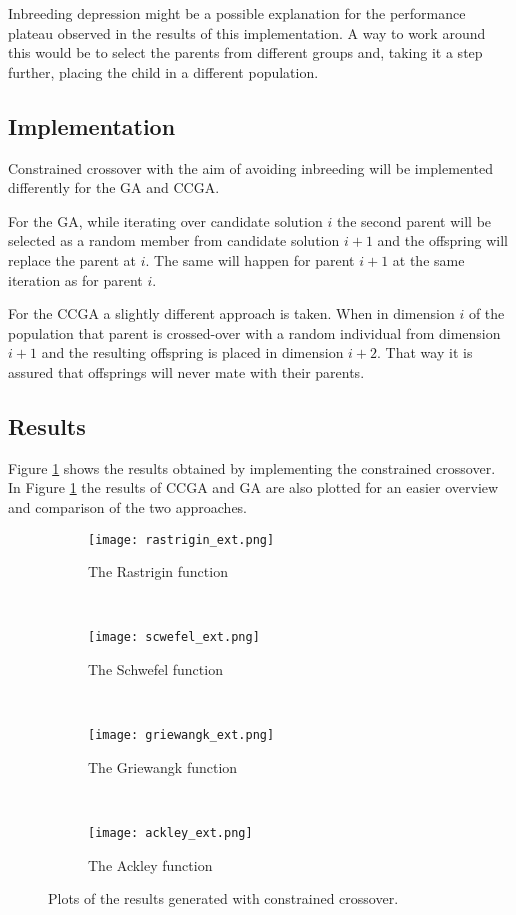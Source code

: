 \documentclass[12pt,a4paper,onecolumn]{article}
\begin{document}
Inbreeding depression might be a possible explanation for the performance plateau observed in the results of this implementation. A way to work around this would be to select the parents from different groups and, taking it a step further, placing the child in a different population.

\subsection{Implementation}
Constrained crossover with the aim of avoiding inbreeding will be implemented differently for the GA and CCGA. 

For the GA, while iterating over candidate solution $i$ the second parent will be selected as a random member from candidate solution $i+1$ and the offspring will replace the parent at $i$. The same will happen for parent $i+1$ at the same iteration as for parent $i$.

For the CCGA a slightly different approach is taken. When in dimension $i$ of the population that parent is crossed-over with a random individual from dimension $i+1$ and the resulting offspring is placed in dimension $i+2$. That way it is assured that offsprings will never mate with their parents.

\subsection{Results}
Figure \ref{ext_plots} shows the results obtained by implementing the constrained crossover. In Figure \ref{ext_plots} the results of CCGA and GA are also plotted for an easier overview and comparison of the two approaches.

\begin{figure}[h]
	\begin{subfigure}[t]{0.5\textwidth}
		\texttt{[image: rastrigin\_ext.png]}
		\caption{The Rastrigin function}
	\end{subfigure}
	~
	\begin{subfigure}[t]{0.5\textwidth}
		\texttt{[image: scwefel\_ext.png]}
		\caption{The Schwefel function}
	\end{subfigure}	\\
	
	\begin{subfigure}[t]{0.5\textwidth}
		\texttt{[image: griewangk\_ext.png]}
		\caption{The Griewangk function}
	\end{subfigure}
	~
	\begin{subfigure}[t]{0.5\textwidth}
		\texttt{[image: ackley\_ext.png]}
		\caption{The Ackley function}
	\end{subfigure}
\caption{Plots of the results generated with constrained crossover.}
\label{ext_plots}	
\end{figure}
\end{document}
